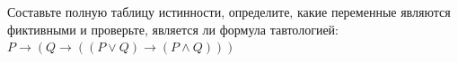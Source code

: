 \question Составьте полную таблицу истинности, определите, какие переменные являются фиктивными и проверьте, является ли формула тавтологией:
$ P \rightarrow (Q \rightarrow ((P \lor Q) \rightarrow (P \land Q)))$
